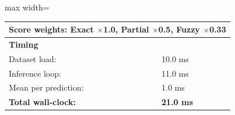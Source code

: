 \begin{table}[htbp]
\begin{adjustbox}{max width=\textwidth}
\begin{tabular}{r p{5cm} r r r r}
\multicolumn{6}{l}{Score weights: Exact $\times$1.0, Partial $\times$0.5, Fuzzy $\times$0.33} \\
\midrule
\multicolumn{6}{l}{\textbf{Timing}} \\
\midrule
\multicolumn{3}{l}{Dataset load:} & \multicolumn{3}{l}{10.0 ms} \\
\multicolumn{3}{l}{Inference loop:} & \multicolumn{3}{l}{11.0 ms} \\
\multicolumn{3}{l}{Mean per prediction:} & \multicolumn{3}{l}{1.0 ms} \\
\multicolumn{3}{l}{\textbf{Total wall-clock:}} & \multicolumn{3}{l}{\textbf{21.0 ms}} \\
\bottomrule
\end{tabular}
\end{adjustbox}
\end{table}

